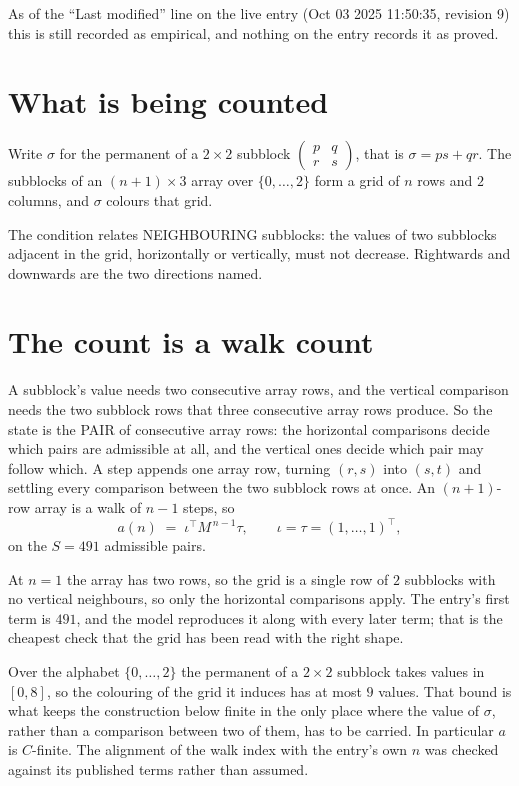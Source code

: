 \documentclass[11pt,a4paper]{article}
\theoremstyle{plain}
\theoremstyle{definition}
\begin{document}
As of the ``Last modified'' line on the live entry (Oct 03 2025 11:50:35, revision 9) this is still
recorded as empirical, and nothing on the entry records it as proved.

\section{What is being counted}

Write $\sigma$ for the permanent of a $2\times2$ subblock
$\begin{pmatrix}p&q\\r&s\end{pmatrix}$, that is $\sigma=ps+qr$. The subblocks of an
$(n+1)\times3$ array over $\{0,\dots,2\}$ form a grid of $n$ rows and $2$
columns, and $\sigma$ colours that grid.

The condition relates NEIGHBOURING subblocks: the values of two subblocks adjacent in the grid,
horizontally or vertically, must not decrease. Rightwards and downwards are the two directions named.

\section{The count is a walk count}

A subblock's value needs two consecutive array rows, and the vertical
comparison needs the two subblock rows that three consecutive array rows produce. So the state
is the PAIR of consecutive array rows: the horizontal comparisons decide which pairs are
admissible at all, and the vertical ones decide which pair may follow which. A step appends one
array row, turning $(r,s)$ into $(s,t)$ and settling every comparison between the two subblock
rows at once. An $(n+1)$-row array is a walk of $n-1$ steps, so
\[
a(n)\;=\;\iota^{\!\top}M^{\,n-1}\tau,\qquad\iota=\tau=(1,\dots,1)^{\!\top},
\]
on the $S=491$ admissible pairs.

At $n=1$ the array has two rows, so the grid is a single row of $2$
subblocks with no vertical neighbours, so only the horizontal comparisons apply. The
entry's first term is $491$, and the model reproduces it along with every later term; that
is the cheapest check that the grid has been read with the right shape.

Over the alphabet $\{0,\dots,2\}$ the permanent of a $2\times2$ subblock takes values in
$[0,8]$, so the colouring of the grid it induces has at most $9$ values.
That bound is what keeps the construction below finite in the only place where the value of
$\sigma$, rather than a comparison between two of them, has to be carried.
In particular $a$ is $C$-finite. The alignment of the walk index with the entry's own $n$ was
checked against its published terms rather than assumed.
\end{document}
